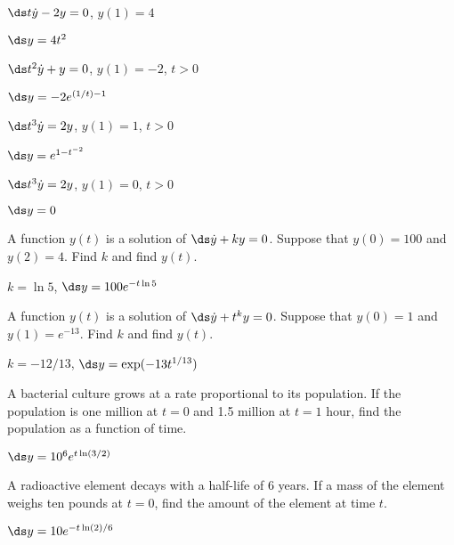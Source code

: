 \begin{exercises}
\exercise $\ds t\dot y - 2y = 0$, $y(1)=4$
\begin{answer} $\ds y=4t^2$
\end{answer}

\exercise $\ds t^2\dot y + y = 0$, $y(1)=-2$, $t>0$
\begin{answer} $\ds y=-2e^{(1/t)-1}$
\end{answer}

\exercise $\ds t^3\dot y = 2y$, $y(1)=1$, $t>0$
\begin{answer} $\ds y=e^{1-t^{-2}}$
\end{answer}

\exercise $\ds t^3\dot y = 2y$, $y(1)=0$, $t>0$
\begin{answer} $\ds y=0$
\end{answer}


\exercise A function $y(t)$ is a solution of $\ds\dot y +
ky=0$. Suppose that $y(0)=100$ and $y(2)=4$. Find $k$ and find $y(t)$.
\begin{answer} $k=\ln 5$, $\ds y=100e^{-t\ln 5}$
\end{answer}

\exercise A function $y(t)$ is a solution of $\ds\dot y +
t^ky=0$. Suppose that $y(0)=1$ and $y(1)=e^{-13}$. Find $k$ and find
$y(t)$. 
\begin{answer} $k=-12/13$, $\ds y=\exp(-13 t^{1/13})$
\end{answer}

\exercise A bacterial culture grows at a rate proportional to its
population. If the population is one million at $t=0$ and 1.5
million at $t=1$ hour, find the population as a function of time.
\begin{answer} $\ds y=10^6e^{t\ln(3/2)}$
\end{answer}

\exercise A radioactive element decays with a half-life of 6 years. If
a mass of the element weighs ten pounds at $t=0$, find the amount of
the element at time $t$.
\begin{answer} $\ds y=10e^{-t\ln(2)/6}$
\end{answer}

\end{exercises}
